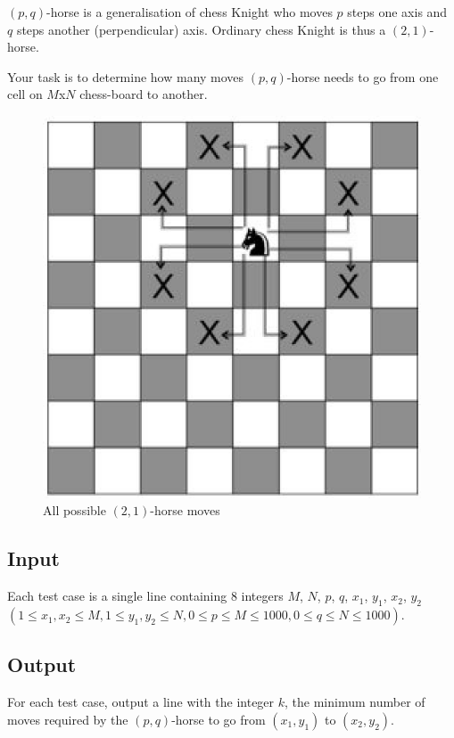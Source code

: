 $(p,q)$-horse is a generalisation of chess Knight who moves $p$ steps one
axis and $q$ steps another (perpendicular) axis. Ordinary chess
Knight is thus a $(2,1)$-horse.

Your task is to determine how many moves $(p,q)$-horse needs to go from one
cell on $M$x$N$ chess-board to another.

\begin{figure}[h!]
    \centering
    \includegraphics[scale=0.25]{pq.jpg}
    \caption{All possible $(2,1)$-horse moves}
\end{figure}

\subsection*{Input}

Each test case is a single line containing 8 integers $M$, $N$, $p$, $q$,
     $x_1$, $y_1$, $x_2$, $y_2$
     $(1 \le x_1, x_2 \le M, 1 \le y_1, y_2 \le N, 0 \le p \le M \le 1000, 0
         \le q \le N \le 1000)$.

\subsection*{Output}
For each test case, output a line with the integer $k$, the minimum number of
moves required by the $(p,q)$-horse to go from $(x_1,y_1)$ to $(x_2,y_2)$.

